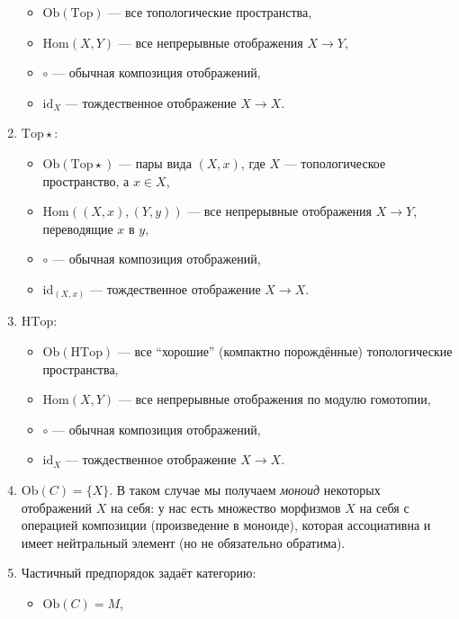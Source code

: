 \documentclass[12pt,a4paper]{article}
\newcommand{\Hom}{\mathrm{Hom}}
\newcommand{\Ob}{\mathrm{Ob}}
\newcommand{\id}{\mathrm{id}}
\newcommand{\Top}{\mathrm{Top}}
\newcommand{\Topstar}{\mathrm{Top\star}}
\newcommand{\HTop}{\mathrm{HTop}}
\begin{document}
\begin{example}
\begin{enumerate}
                \begin{itemize}
                    \item $\Ob(\Top)$ --- все топологические пространства,
                    \item $\Hom(X, Y)$ --- все непрерывные отображения $X \to Y$,
                    \item $\circ$ --- обычная композиция отображений,
                    \item $\id_X$ --- тождественное отображение $X \to X$.
                \end{itemize}
            \item $\Topstar$:
                \begin{itemize}
                    \item $\Ob(\Topstar)$ --- пары вида $(X, x)$, где $X$ --- топологическое пространство, а $x \in X$,
                    \item $\Hom((X, x), (Y, y))$ --- все непрерывные отображения $X \to Y$, переводящие $x$ в $y$,
                    \item $\circ$ --- обычная композиция отображений,
                    \item $\id_{(X, x)}$ --- тождественное отображение $X \to X$.
                \end{itemize}
            \item $\HTop$:
                \begin{itemize}
                    \item $\Ob(\HTop)$ --- все ``хорошие'' (компактно порождённые) топологические пространства,
                    \item $\Hom(X, Y)$ --- все непрерывные отображения по модулю гомотопии,
                    \item $\circ$ --- обычная композиция отображений,
                    \item $\id_X$ --- тождественное отображение $X \to X$.
                \end{itemize}
            \item $\Ob(C) = \{X\}$. В таком случае мы получаем \emph{моноид} некоторых отображений $X$ на себя: у нас есть множество морфизмов $X$ на себя с операцией композиции (произведение в моноиде), которая ассоциативна и имеет нейтральный элемент (но не обязательно обратима).
            \item Частичный предпорядок задаёт категорию:
                \begin{itemize}
                    \item $\Ob(C) = M$,

\end{itemize}
\end{enumerate}
\end{example}
\end{document}
